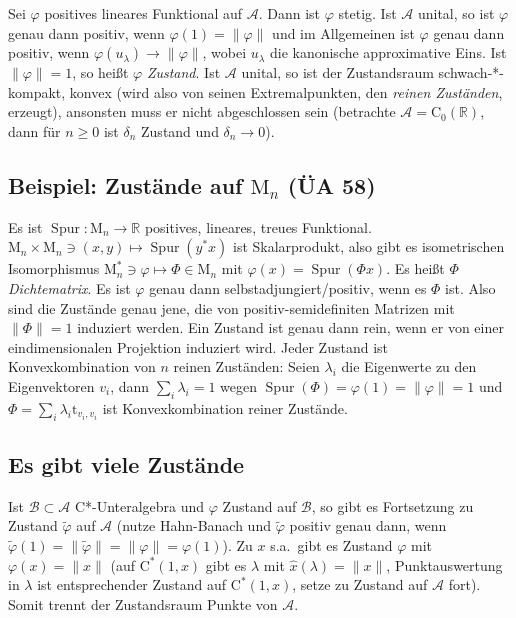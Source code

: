 \documentclass[11pt,a4paper]{scrartcl}
\newcommand{\R}{\mathbb{R}} %
\newcommand{\A}{\mathcal{A}}
\newcommand{\B}{\mathcal{B}}
\theoremstyle{plain}
\theoremstyle{definition}
\theoremstyle{remark}
\DeclareMathOperator{\Spur}{Spur}
\begin{document}
Sei $\varphi$ positives lineares Funktional auf $\A$. Dann ist $\varphi$ stetig. Ist $\A$ unital, so ist $\varphi$ genau dann positiv, wenn $\varphi(1)=\|\varphi\|$ und im Allgemeinen ist $\varphi$ genau dann positiv, wenn $\varphi(u_\lambda)\to \|\varphi\|$, wobei $u_\lambda$ die kanonische approximative Eins. Ist $\|\varphi\|=1$, so heißt $\varphi$ \emph{Zustand}. Ist $\A$ unital, so ist der Zustandsraum schwach-*-kompakt, konvex (wird also von seinen Extremalpunkten, den \emph{reinen Zuständen}, erzeugt), ansonsten muss er nicht abgeschlossen sein (betrachte $\A=\mathrm{C}_0(\R)$, dann für $n\geq 0$ ist $\delta_n$ Zustand und $\delta_n \to 0$).

\subsection{Beispiel: Zustände auf $\mathrm{M}_n$ (ÜA 58)}

Es ist $\Spur: \mathrm{M}_n \to \R$ positives, lineares, treues Funktional. $\mathrm{M}_n\times \mathrm{M}_n\ni (x,y)\mapsto \Spur(y^*x)$ ist Skalarprodukt, also gibt es isometrischen Isomorphismus $\mathrm{M}_n^*\ni \varphi \mapsto \Phi \in \mathrm{M}_n$ mit $\varphi(x)=\Spur(\Phi x)$. Es heißt $\Phi$ \emph{Dichtematrix}. Es ist $\varphi$ genau dann selbstadjungiert/positiv, wenn es $\Phi$ ist. Also sind die Zustände genau jene, die von positiv-semidefiniten Matrizen mit $\|\Phi\|=1$ induziert werden. Ein Zustand ist genau dann rein, wenn er von einer eindimensionalen Projektion induziert wird. Jeder Zustand ist Konvexkombination von $n$ reinen Zuständen: Seien $\lambda_i$ die Eigenwerte zu den Eigenvektoren $v_i$, dann $\sum_i \lambda_i = 1$ wegen $\Spur(\Phi)=\varphi(1)=\|\varphi\|=1$ und $\Phi = \sum_i \lambda_i \mathrm{t}_{v_i,v_i}$ ist Konvexkombination reiner Zustände.

\subsection{Es gibt viele Zustände}

Ist $\B \subset \A$ C*-Unteralgebra und $\varphi$ Zustand auf $\B$, so gibt es Fortsetzung zu Zustand $\tilde \varphi$ auf $\A$ (nutze Hahn-Banach und $\tilde \varphi$ positiv genau dann, wenn $\tilde\varphi(1)=\|\tilde\varphi\|=\|\varphi\|=\varphi(1)$). Zu $x$ s.a.\ gibt es Zustand $\varphi$ mit $\varphi(x)=\|x\|$ (auf $\mathrm{C}^*(1,x)$ gibt es $\lambda$ mit $\hat x(\lambda)=\|x\|$, Punktauswertung in $\lambda$ ist entsprechender Zustand auf $\mathrm{C}^*(1,x)$, setze zu Zustand auf $\A$ fort). Somit trennt der Zustandsraum Punkte von $\A$.
\end{document}
